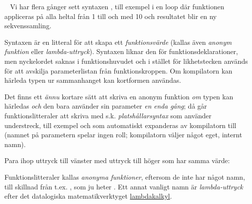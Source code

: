 \begin{ConceptConnections}

\end{ConceptConnections}

\SOLUTION

\TaskSolved \what

\begin{ConceptConnections}
  
\end{ConceptConnections}

\QUESTEND





\QUESTBEGIN

\Task  \what~  Vi har flera gånger sett syntaxen , till exempel i en loop  där funktionen  appliceras på alla heltal från 1 till och med 10 och resultatet blir en ny sekvenssamling.

Syntaxen  är en litteral för att skapa ett \emph{funktionsvärde} (kallas även \emph{anonym funktion} eller \emph{lambda-uttryck}). Syntaxen liknar den för funktionsdeklarationer, men nyckelordet  saknas i funktionshuvudet och i stället för likhetstecken används \code{=>} för att avskilja parameterlistan från funktionskroppen.
Om kompilatorn kan härleda typen ur sammanhanget kan kortformen  användas.

Det finns ett \emph{ännu} kortare sätt att skriva en anonym funktion \emph{om} typen kan härledas \emph{och} den bara använder sin parameter \emph{en enda gång}; då går funktionslitteraler att skriva med s.k. \emph{platshållarsyntax} som använder understreck, till exempel  och som automatiskt expanderas av kompilatorn till  (namnet på parametern spelar ingen roll; kompilatorn väljer något eget, internt namn).

Para ihop uttryck till vänster med uttryck till höger som har samma värde:

\begin{ConceptConnections}

\end{ConceptConnections}

\noindent
Funktionslitteraler kallas \textit{anonyma funktioner}, eftersom de inte har något namn, till skillnad från t.ex. , som ju heter . Ett annat vanligt namn är \textit{lambda-uttryck} efter det datalogiska matematikverktyget \href{https://sv.wikipedia.org/wiki/Lambdakalkyl}{lambdakalkyl}.

